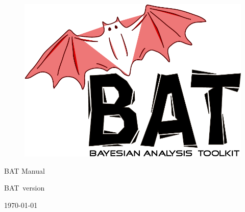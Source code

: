 \documentclass[
11pt,
a4paper,
bibliography=totoc,
captions=nooneline, %
numbers=noenddot,
twoside]{scrbook}
\newcommand{\bat}{{\sc BAT}}
\newcommand{\version}{version~\versionno}
\begin{document}

\thispagestyle{empty}

\begin{figure}
\includegraphics[scale=0.25]{bat}
\end{figure}

\vspace*{1cm}

\begin{center}


{\Large \bat{} Manual}
\\

\vspace{1cm}

{\large \bat\ \version}

\end{center}

\thispagestyle{empty}

\vfill

\begin{center}
\today
\end{center}

\pagebreak


\thispagestyle{empty}

\enlargethispage{2cm}

\tableofcontents{}


\mainmatter
\end{document}

